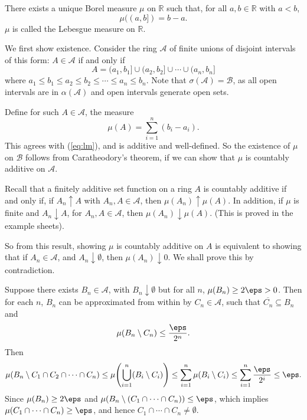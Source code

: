 \documentclass[12pt]{article}
\begin{document}
\begin{theorem}
	There exists a unique Borel measure $\mu$ on $\mathbb{R}$ such that, for all $a, b \in \mathbb{R}$ with $a < b$,
	\[
		\mu((a, b]) = b - a. \tag{3.1}\label{eq:lm}
	\]
	$\mu$ is called the Lebesgue measure on $\mathbb{R}$.
\end{theorem}

\begin{proofbox}
	We first show existence. Consider the ring $\mathcal{A}$ of finite unions of disjoint intervals of this form: $A \in \mathcal{A}$ if and only if
	\[
		A = (a_1, b_1] \cup (a_2, b_2] \cup \cdots \cup (a_n, b_n]
	\]
	where $a_1 \leq b_1 \leq a_2 \leq b_2 \leq \cdots \leq a_n \leq b_n$. Note that $\sigma(\mathcal{A}) = \mathcal{B}$, as all open intervals are in $\alpha(\mathcal{A})$ and open intervals generate open sets.

	Define for such $A \in \mathcal{A}$, the measure
	\[
	\mu(A) = \sum_{i = 1}^{n}(b_i - a_i).
	\]
	This agrees with (\ref{eq:lm}), and is additive and well-defined. So the existence of $\mu$ on $\mathcal{B}$ follows from Caratheodory's theorem, if we can show that $\mu$ is countably additive on $\mathcal{A}$.

	Recall that a finitely additive set function on a ring $A$ is countably additive if and only if, if $A_n \uparrow A$ with $A_n, A \in \mathcal{A}$, then $\mu(A_n) \uparrow \mu(A)$. In addition, if $\mu$ is finite and $A_n \downarrow A$, for $A_n, A \in \mathcal{A}$, then $\mu(A_n) \downarrow \mu(A)$. (This is proved in the example sheets).

	So from this result, showing $\mu$ is countably additive on $A$ is equivalent to showing that if $A_n \in \mathcal{A}$, and $A_n \downarrow \emptyset$, then $\mu(A_n) \downarrow 0$. We shall prove this by contradiction.

	Suppose there exists $B_n \in \mathcal{A}$, with $B_n \downarrow \emptyset$ but for all $n$, $\mu(B_n) \geq 2\eps > 0$. Then for each $n$, $B_n$ can be approximated from within by $C_n \in \mathcal{A}$, such that $\overline{C_n} \subseteq B_n$ and
	\[
	\mu(B_n \setminus C_n) \leq \frac{\eps}{2^{n}}.
	\]
	Then
	\[
	\mu(B_n \setminus C_1 \cap C_2 \cap \cdots \cap C_n) \leq \mu \Biggl( \bigcup_{i = 1}^{n} (B_i \setminus C_i) \Biggr) \leq \sum_{i = 1}^{n} \mu(B_i \setminus C_i) \leq \sum_{i = 1}^{n} \frac{\eps}{2^{i}}  \leq \eps.
	\]
	Since $\mu(B_n) \geq 2\eps$ and $\mu(B_n \setminus(C_1 \cap \cdots \cap C_n)) \leq \eps$, which implies $\mu(C_1 \cap \cdots \cap C_n) \geq \eps$, and hence $C_1 \cap \cdots \cap C_n \neq \emptyset$.


\end{proofbox}
\end{document}
